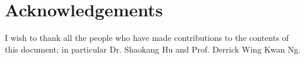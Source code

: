 \chapter*{Acknowledgements}\label{ack}
I wish to thank all the people who have made contributions to the contents
of this document; in particular Dr. Shaokang Hu and Prof. Derrick Wing Kwan Ng.
